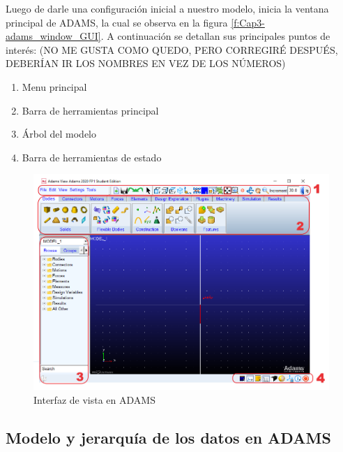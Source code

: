             Luego de darle una configuración inicial a nuestro modelo, inicia la ventana principal de ADAMS, la cual se observa en la figura \eqref{f:Cap3-adams_window_GUI}. A continuación se detallan sus principales puntos de interés: (NO ME GUSTA COMO QUEDO, PERO CORREGIRÉ DESPUÉS, DEBERÍAN IR LOS NOMBRES EN VEZ DE LOS NÚMEROS)
            
            \begin{enumerate}
                \item Menu principal
                \item Barra de herramientas principal
                \item Árbol del modelo
                \item Barra de herramientas de estado
            \end{enumerate}
            
            \begin{figure}[H]
                \centering
                \includegraphics[width=1\linewidth]{Main/Chapter3/Images3/adams/interfaz_vista_adams.png}
                \caption{Interfaz de vista en ADAMS}
                \label{f:Cap3-adams_window_GUI}
            \end{figure} 
            
            
            
            
            
    \subsection{Modelo y jerarquía de los datos en ADAMS}
    
